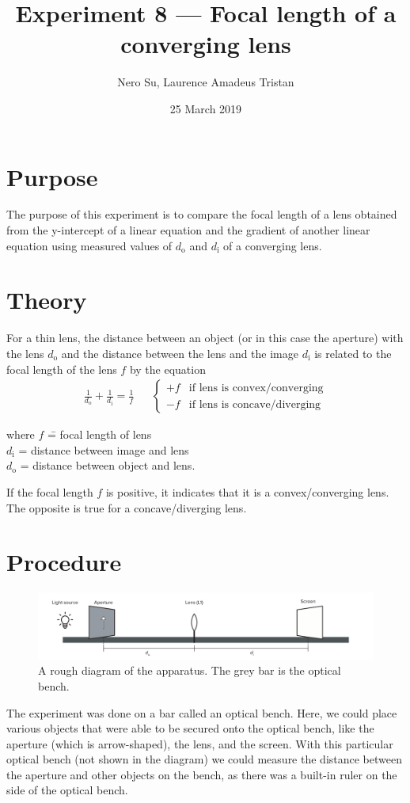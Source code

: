 \documentclass[letter,12pt]{article}
\title{Experiment 8 --- Focal length of a converging lens}
\author{Nero Su, Laurence Amadeus Tristan}
\date{25 March 2019}
\numberwithin{equation}{section}
\numberwithin{figure}{section}
\numberwithin{table}{section}
\newcommand{\dist}[1] {\(d_{\mathrm{#1}}\)}
\newcommand{\mdist}[1] {d_{\mathrm{#1}}}
\begin{document}
\maketitle
\section{Purpose}
The purpose of this experiment is to compare the focal length of a lens obtained from the y-intercept of a linear equation and the gradient of another linear equation using measured values of \(d_{\mathrm{o}}\) and \(d_{\mathrm{i}}\) of a converging lens.

\section{Theory}
For a thin lens, the distance between an object (or in this case the aperture) with the lens \dist{o} and the distance between the lens and the image \dist{i} is related to the focal length of the lens \(f\) by the equation
\begin{align} \label{eq:t1}
  \frac{1}{\mdist{o}} + \frac{1}{\mdist{i}} = \frac{1}{f} && \begin{cases}
    +f& \text{if lens is convex/converging} \\
    -f& \text{if lens is concave/diverging}
  \end{cases}
\end{align}

\begin{tabbing}
  where \= \(f\) \= = focal length of lens \\
  \> \dist{i} \> = distance between image and lens \\
  \> \dist{o} \> = distance between object and lens.
\end{tabbing}

If the focal length \(f\) is positive, it indicates that it is a convex/converging lens. The opposite is true for a concave/diverging lens.

\newpage
\section{Procedure}
\begin{figure}[!ht]
  \centering
  \includegraphics[width=\textwidth]{apparatus.pdf}
  \caption{A rough diagram of the apparatus. The grey bar is the optical bench.}
  \label{fig:p1}
\end{figure}
The experiment was done on a bar called an optical bench. Here, we could place various objects that were able to be secured onto the optical bench, like the aperture (which is arrow-shaped), the lens, and the screen. With this particular optical bench (not shown in the diagram) we could measure the distance between the aperture and other objects on the bench, as there was a built-in ruler on the side of the optical bench.
\end{document}
